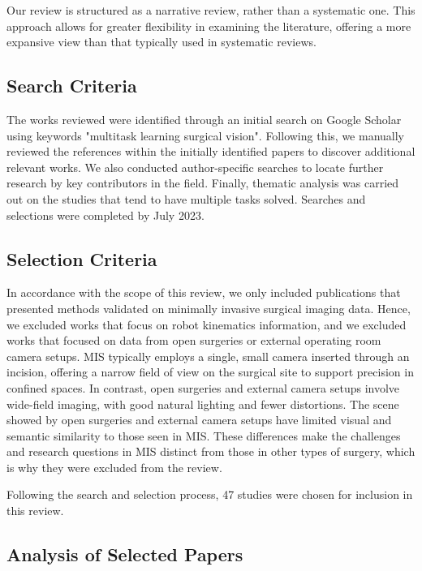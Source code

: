 Our review is structured as a narrative review, rather than a systematic one. This approach allows for greater flexibility in examining the literature, offering a more expansive view than that typically used in systematic reviews.

\subsection{Search Criteria }
The works reviewed were identified through an initial search on Google Scholar using keywords "multitask learning surgical vision". Following this, we manually reviewed the references within the initially identified papers to discover additional relevant works. We also conducted author-specific searches to locate further research by key contributors in the field. Finally, thematic analysis was carried out on the studies that tend to have multiple tasks solved. Searches and selections were completed by July 2023.


\subsection{Selection Criteria}
In accordance with the scope of this review, we only included publications that presented methods validated on minimally invasive surgical imaging data. Hence, we excluded works that focus on robot kinematics information, and we excluded works that focused on data from open surgeries or external operating room camera setups. 
MIS typically employs a single, small camera inserted through an incision, offering a narrow field of view on the surgical site to support precision in confined spaces. In contrast, open surgeries and external camera setups involve wide-field imaging, with good natural lighting and fewer distortions. The scene showed by  open surgeries and external camera setups have limited visual and semantic similarity to those seen in MIS. These differences make the challenges and research questions in MIS distinct from those in other types of surgery, which is why they were excluded from the review.

Following the search and selection process, 47 studies were chosen for inclusion in this review.

\subsection{Analysis of Selected Papers}

